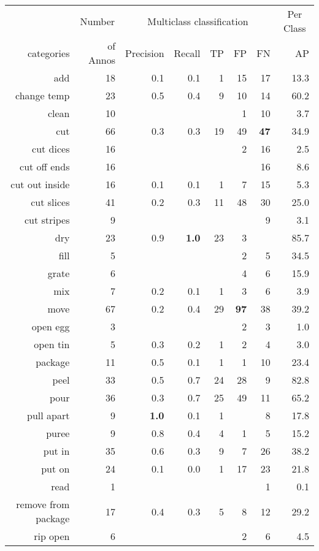 \begin{tabular}{r r r@{\ \ }r@{\ \ }r@{\ \ }r@{\ \ }r r}
\toprule  & \multicolumn{1}{c}{Number}  & \multicolumn{5}{c}{Multiclass classification}  & \multicolumn{1}{c}{Per Class} \\
categories&of Annos&Precision&Recall&TP&FP&FN&AP\\
\cmidrule(lr){1-1} \cmidrule(lr){2-2} \cmidrule(lr){3-7} \cmidrule(lr){8-8}
add & 18 & 0.1 & 0.1 & 1 & 15 & 17 & 13.3 \\
change temp & 23 & 0.5 & 0.4 & 9 & 10 & 14 & 60.2 \\
clean & 10 &  &  &  & 1 & 10 & 3.7 \\
cut & 66 & 0.3 & 0.3 & 19 & 49 & \textbf{47} & 34.9 \\
cut dices & 16 &  &  &  & 2 & 16 & 2.5 \\
cut off ends & 16 &  &  &  &  & 16 & 8.6 \\
cut out inside & 16 & 0.1 & 0.1 & 1 & 7 & 15 & 5.3 \\
cut slices & 41 & 0.2 & 0.3 & 11 & 48 & 30 & 25.0 \\
cut stripes & 9 &  &  &  &  & 9 & 3.1 \\
dry & 23 & 0.9 & \textbf{1.0} & 23 & 3 &  & 85.7 \\
fill & 5 &  &  &  & 2 & 5 & 34.5 \\
grate & 6 &  &  &  & 4 & 6 & 15.9 \\
mix & 7 & 0.2 & 0.1 & 1 & 3 & 6 & 3.9 \\
move & 67 & 0.2 & 0.4 & 29 & \textbf{97} & 38 & 39.2 \\
open egg & 3 &  &  &  & 2 & 3 & 1.0 \\
open tin & 5 & 0.3 & 0.2 & 1 & 2 & 4 & 3.0 \\
package & 11 & 0.5 & 0.1 & 1 & 1 & 10 & 23.4 \\
peel & 33 & 0.5 & 0.7 & 24 & 28 & 9 & 82.8 \\
pour & 36 & 0.3 & 0.7 & 25 & 49 & 11 & 65.2 \\
pull apart & 9 & \textbf{1.0} & 0.1 & 1 &  & 8 & 17.8 \\
puree & 9 & 0.8 & 0.4 & 4 & 1 & 5 & 15.2 \\
put in & 35 & 0.6 & 0.3 & 9 & 7 & 26 & 38.2 \\
put on & 24 & 0.1 & 0.0 & 1 & 17 & 23 & 21.8 \\
read & 1 &  &  &  &  & 1 & 0.1 \\
remove from package & 17 & 0.4 & 0.3 & 5 & 8 & 12 & 29.2 \\
rip open & 6 &  &  &  & 2 & 6 & 4.5 \\

\end{tabular}
